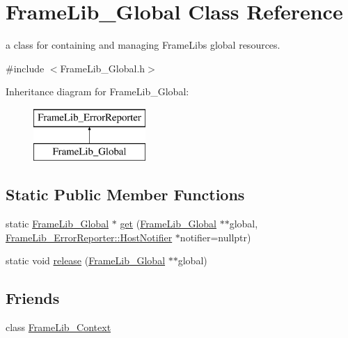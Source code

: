 \hypertarget{class_frame_lib___global}{}\section{Frame\+Lib\+\_\+\+Global Class Reference}
\label{class_frame_lib___global}


a class for containing and managing Frame\+Lib\textquotesingle{}s global resources.  




{\ttfamily \#include $<$Frame\+Lib\+\_\+\+Global.\+h$>$}

Inheritance diagram for Frame\+Lib\+\_\+\+Global\+:\begin{figure}[H]
\begin{center}
\leavevmode
\includegraphics[height=2.000000cm]{class_frame_lib___global}
\end{center}
\end{figure}
\subsection*{Static Public Member Functions}
\begin{DoxyCompactItemize}
\item 
static \hyperlink{class_frame_lib___global}{Frame\+Lib\+\_\+\+Global} $\ast$ \hyperlink{class_frame_lib___global_a2d24a293da4c71e089e4738cfbbf6aec}{get} (\hyperlink{class_frame_lib___global}{Frame\+Lib\+\_\+\+Global} $\ast$$\ast$global, \hyperlink{struct_frame_lib___error_reporter_1_1_host_notifier}{Frame\+Lib\+\_\+\+Error\+Reporter\+::\+Host\+Notifier} $\ast$notifier=nullptr)
\item 
static void \hyperlink{class_frame_lib___global_a079e2b866b66d477ae551e0b0e12ea11}{release} (\hyperlink{class_frame_lib___global}{Frame\+Lib\+\_\+\+Global} $\ast$$\ast$global)
\end{DoxyCompactItemize}
\subsection*{Friends}
\begin{DoxyCompactItemize}
\item 
class \hyperlink{class_frame_lib___global_a6a4d0dd2956393d740d97600370f6ef8}{Frame\+Lib\+\_\+\+Context}
\end{DoxyCompactItemize}
